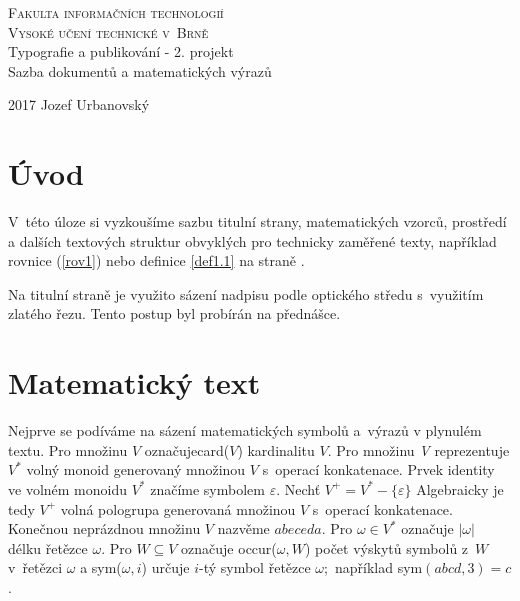 \documentclass[a4paper,11pt]{article}
\begin{document}
	
	\begin{center}
		\Huge
		\textsc{Fakulta informačních technologií\\
			Vysoké učení technické v~Brně}\\
		\Large{Typografie a publikování - 2. projekt\\
			Sazba dokumentů a matematických výrazů}
	\end{center}

	\thispagestyle{empty}
	\normalsize{2017 \hfill Jozef Urbanovský}
	\newpage
	\setcounter{page}{1}
	\twocolumn
	
	\section*{Úvod}
	V~této úloze si vyzkoušíme sazbu titulní strany, matematických vzorců, 
	prostředí a dalších textových struktur obvyklých pro technicky 
	zaměřené texty, například rovnice (\ref{rov1}) nebo definice \ref{def1.1} 
	na straně \pageref{def1.1}.\par
	
	Na titulní straně je využito sázení nadpisu podle optického středu 
	s~využitím zlatého řezu. Tento postup byl probírán na přednášce.\par

	\section {Matematický text}
	Nejprve se podíváme na sázení matematických symbolů a~výrazů v plynulém textu. 
	Pro množinu $V$ označuje\linebreak card($V$) kardinalitu $V$.
	Pro množinu \emph{V} reprezentuje $V^*$ volný monoid 
	generovaný množinou $V$ s~operací konkatenace.
	Prvek identity ve volném monoidu $V^*$ značíme symbolem $\varepsilon$.
	Nechť $V^+=V^*-\{\varepsilon\}$ Algebraicky je tedy $V^+$ volná 
	pologrupa generovaná množinou $V$ s~operací konkatenace.
	Konečnou neprázdnou množinu $V$ nazvěme $abeceda$.
	Pro $\omega\in V^*$ označuje $|\omega|$ délku řetězce $\omega$. 
	Pro $W \subseteq V$ označuje occur($\omega,W$) 
	počet výskytů symbolů z~$W$ v~řetězci $\omega$ a sym($\omega,i$) 
	určuje $i$-tý symbol řetězce $\omega$;~například sym$(abcd,3)=c$.\par
	
\end{document}
